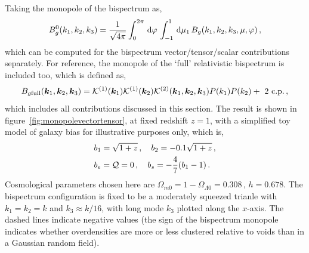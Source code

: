 Taking the monopole of the bispectrum as, 
\begin{equation}
	B_g^0 (k_1,k_2,k_3) = \frac{1}{\sqrt{4\pi}} \int_0^{2\pi}\,\mathrm{d}\varphi\, \int_{-1}^1 \,\mathrm{d}\mu_1\, B_g(k_1, k_2, k_3, \mu, \varphi)\,,
\end{equation}
which can be computed for the bispectrum vector/tensor/scalar contributions separately. For reference, the monopole of the `full' relativistic bispectrum is included too, which is defined as, 
\begin{equation}
	B_{g\mathrm{full}}(\bm {k}_1,\bm {k}_2,\bm {k}_3)= \mathcal{K}^{(1)}(\bm {k}_1) \mathcal{K}^{(1)}(\bm {k}_2) \mathcal{K}^{(2)}(\bm {k}_1,\bm {k}_2,\bm {k}_3) P(k_1) P(k_2) + \text{ 2 c.p.}\,,
\end{equation}
which includes all contributions discussed in this section. The result is shown in figure~\ref{fig:monopolevectortensor}, at fixed redshift $z=1$, with a simplified toy model of galaxy bias for illustrative purposes only, which is,~\cite{Jolicoeur:2017eyi}
\begin{align}
	&b_1 = \sqrt{1 + z}\,, \quad b_2 = -0.1 \sqrt{1 + z}\,,\nonumber \\
	&b_e = \mathcal{Q} = 0\,,\quad b_s = - \frac{4}{7}(b_1 - 1)\,.
\end{align}
Cosmological parameters chosen here are $\Omega_{m0} = 1 - \Omega_{\Lambda0} = 0.308\,,\, h = 0.678$. The bispectrum configuration is fixed to be a moderately squeezed trianle with $k_1 = k_2 = k$ and $k_3 \approx k/16$, with long mode $k_3$ plotted along the $x$-axis. The dashed lines indicate negative values (the sign of the bispectrum monopole indicates whether overdensities are more or less clustered relative to voids than in a Gaussian random field). 

